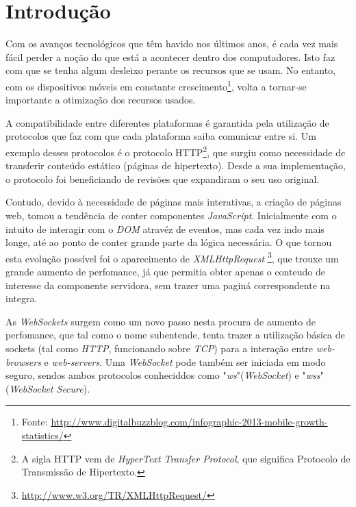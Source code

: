 \documentclass[a4paper]{article}
\begin{document}

\newpage
\thispagestyle{empty} %

\tableofcontents

\newpage
\setcounter{page}{1} %

\section{Introdução}

Com os avanços tecnológicos que têm havido nos últimos anos, é cada vez mais fácil perder a noção
do que está a acontecer dentro dos computadores. Isto faz com que se tenha algum desleixo perante os recursos que se usam. No entanto, com os dispositivos móveis em constante crescimento\footnote{Fonte: \url{http://www.digitalbuzzblog.com/infographic-2013-mobile-growth-statistics/}}, volta a tornar-se importante a otimização dos recursos usados.

A compatibilidade entre diferentes plataformas é garantida pela utilização de protocolos que faz com que cada plataforma saiba comunicar entre si. Um exemplo desses protocolos é o protocolo HTTP\footnote{A sigla HTTP vem de \emph{HyperText Transfer Protocol}, que significa Protocolo de Transmissão de Hipertexto.}, que surgiu como necessidade de transferir conteúdo estático (páginas de hipertexto). Desde a sua implementação, o protocolo foi beneficiando de revisões que expandiram o seu uso original.

Contudo, devido à necessidade de páginas mais interativas, a criação de páginas web, tomou a tendência de conter componentes \emph{JavaScript}. Inicialmente com o intuito de interagir com o \emph{DOM} atravéz de eventos, mas cada vez indo mais longe, até ao ponto de conter grande parte da lógica necessária. O que tornou esta evolução possível foi o aparecimento de \emph{XMLHttpRequest} \footnote{\url{http://www.w3.org/TR/XMLHttpRequest/}}, que trouxe um grande aumento de perfomance, já que permitia obter apenas o conteudo de interesse da componente servidora, sem trazer uma paginá correspondente na integra.

As \emph{WebSockets} surgem como um novo passo nesta procura de aumento de perfomance, que tal como o nome subentende, tenta trazer a utilização básica de sockets (tal como \emph{HTTP}, funcionando sobre \emph{TCP}) para a interação entre \emph{web-browsers} e \emph{web-servers}. Uma \emph{WebSocket} pode também ser iniciada em modo seguro, sendos ambos protocolos conheciddos como "\emph{ws}"(\emph{WebSocket}) e "\emph{wss}" (\emph{WebSocket Secure}).
\end{document}
